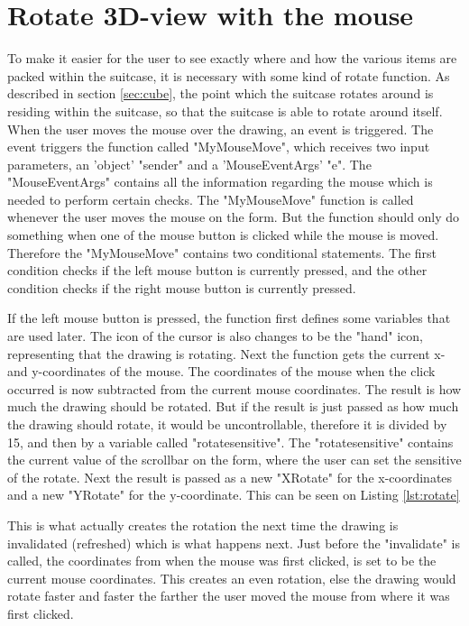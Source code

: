 \section{Rotate 3D-view with the mouse}

To make it easier for the user to see exactly where and how the various items are packed within the suitcase, it is necessary with some kind of rotate function. As described in section \ref{sec:cube}, the point which the suitcase rotates around is residing within the suitcase, so that the suitcase is able to rotate around itself. When the user moves the mouse over the drawing, an event is triggered. The event triggers the function called "MyMouseMove", which receives two input parameters, an 'object' "sender" and a 'MouseEventArgs' "e". The "MouseEventArgs" contains all the information regarding the mouse which is needed to perform certain checks. The "MyMouseMove" function is called whenever the user moves the mouse on the form. But the function should only do something when one of the mouse button is clicked while the mouse is moved. Therefore the "MyMouseMove" contains two conditional statements. The first condition checks if the left mouse button is currently pressed, and the other condition checks if the right mouse button is currently pressed.

If the left mouse button is pressed, the function first defines some variables that are used later. The icon of the cursor is also changes to be the "hand" icon, representing that the drawing is rotating. Next the function gets the current x- and y-coordinates of the mouse. The coordinates of the mouse when the click occurred is now subtracted from the current mouse coordinates. The result is how much the drawing should be rotated. But if the result is just passed as how much the drawing should rotate, it would be uncontrollable, therefore it is divided by 15, and then by a variable called "rotatesensitive". The "rotatesensitive" contains the current value of the scrollbar on the form, where the user can set the sensitive of the rotate. Next the result is passed as a new "XRotate" for the x-coordinates and a new "YRotate" for the y-coordinate. This can be seen on Listing \ref{lst:rotate}


This is what actually creates the rotation the next time the drawing is invalidated (refreshed) which is what happens next. Just before the "invalidate" is called, the coordinates from when the mouse was first clicked, is set to be the current mouse coordinates. This creates an even rotation, else the drawing would rotate faster and faster the farther the user moved the mouse from where it was first clicked. 